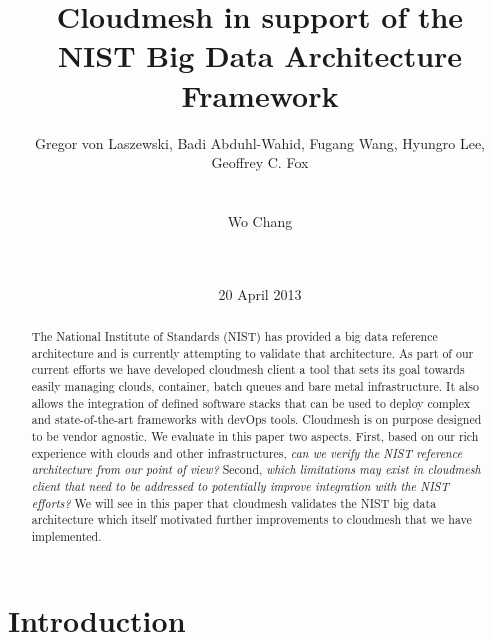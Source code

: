 

\newcommand{\TODO}[1]{\todo[inline,color=red!20]{#1}}

\title{Cloudmesh in support of the\\NIST Big Data Architecture Framework}


\author{
\alignauthor
Gregor von Laszewski, Badi Abduhl-Wahid, Fugang Wang, Hyungro Lee, Geoffrey C. Fox\\
       \\
       \\
\alignauthor
Wo Chang\\
       \\
       \\
}
\date{20 April 2013}

\maketitle

\listoftodos[Notes]

\begin{abstract}
  The National Institute of Standards (NIST) has provided a big data
  reference architecture and is currently attempting to validate that
  architecture. As part of our current efforts we have developed
  cloudmesh client a tool that sets its goal towards easily managing
  clouds, container, batch queues and bare metal infrastructure. It
  also allows the integration of defined software stacks that can be
  used to deploy complex and state-of-the-art frameworks with devOps
  tools. Cloudmesh is on purpose designed to be vendor agnostic. We
  evaluate in this paper two aspects. First, based on our rich
  experience with clouds and other infrastructures, {\it can we verify the
  NIST reference architecture from our point of view?} Second, {\it which
  limitations may exist in cloudmesh client that need to be addressed
  to potentially improve integration with the NIST efforts?}  We will
  see in this paper that cloudmesh validates the NIST big data
  architecture which itself motivated further improvements to
  cloudmesh that we have implemented.
\end{abstract}


\section{Introduction}


